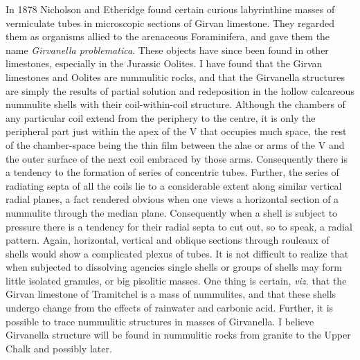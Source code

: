 \documentclass[a4paper, 12pt, oneside]{article}
\begin{document}
In 1878 Nicholson and Etheridge found certain curious labyrinthine masses of vermiculate tubes in microscopic sections of Girvan limestone. They regarded them as organisms allied to the arenaceous Foraminifera, and gave them the name \emph{Girvanella problematica}. These objects have since been found in other limestones, especially in the Jurassic Oolites. I have found that the Girvan limestones and Oolites are nummulitic rocks, and that the Girvanella structures are simply the results of partial solution and redeposition in the hollow calcareous nummulite shells with their coil-within-coil structure. Although the chambers of any particular coil extend from the periphery to the centre, it is only the peripheral part just within the apex of the V that occupies much space, the rest of the chamber-space being the thin film between the alae or arms of the V and the outer surface of the next coil embraced by those arms. Consequently there is a tendency to the formation of series of concentric tubes. Further, the series of radiating septa of all the coils lie to a considerable extent along similar vertical radial planes, a fact rendered obvious when one views a horizontal section of a nummulite through the median plane. Consequently when a shell is subject to pressure there is a tendency for their radial septa to cut out, so to speak, a radial pattern. Again, horizontal, vertical and oblique sections through rouleaux of shells would show a complicated plexus of tubes. It is not difficult to realize that when subjected to dissolving agencies single shells or groups of shells may form little isolated granules, or big pisolitic masses. One thing is certain, \emph{viz.} that the Girvan limestone of Tramitchel is a mass of nummulites, and that these shells undergo change from the effects of rainwater and carbonic acid. Further, it is possible to trace nummulitic structures in masses of Girvanella. I believe Girvanella structure will be found in nummulitic rocks from granite to the Upper Chalk and possibly later.
\end{document}

